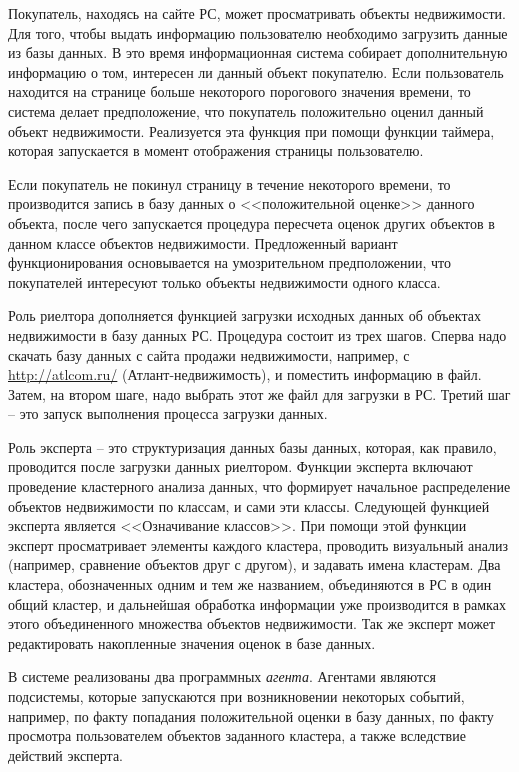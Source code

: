 \documentclass[a4paper,14pt,openany,final]{extreport} %
\begin{document}
Покупатель, находясь на сайте РС, может просматривать объекты недвижимости.  Для того, чтобы выдать информацию пользователю необходимо загрузить данные из базы данных. В это время информационная система собирает дополнительную информацию о том, интересен ли данный объект покупателю. Если пользователь находится на странице больше некоторого порогового значения времени, то система делает предположение, что покупатель положительно оценил данный объект недвижимости. Реализуется эта функция при помощи функции таймера, которая запускается в момент отображения страницы пользователю.

Если покупатель не покинул страницу в течение некоторого времени, то производится запись в базу данных о <<положительной оценке>> данного объекта, после чего запускается процедура пересчета оценок других объектов в данном классе объектов недвижимости. Предложенный вариант функционирования основывается на умозрительном предположении, что покупателей интересуют только объекты недвижимости одного класса.

Роль риелтора дополняется функцией загрузки исходных данных об объектах недвижимости в базу данных РС. Процедура состоит из трех шагов. Сперва надо скачать базу данных с сайта продажи недвижимости, например, с \url{http://atlcom.ru/} (Атлант-недвижимость), и поместить информацию в файл.  Затем, на втором шаге, надо выбрать этот же файл для загрузки в РС.  Третий шаг -- это запуск выполнения процесса загрузки данных.

Роль эксперта -- это структуризация данных базы данных, которая, как правило, проводится после загрузки данных риелтором. Функции эксперта включают проведение кластерного анализа данных, что формирует начальное распределение объектов недвижимости по классам, и сами эти классы.  Следующей функцией эксперта является <<Означивание классов>>.  При помощи этой функции эксперт просматривает элементы каждого кластера, проводить визуальный анализ (например, сравнение объектов друг с другом), и задавать имена кластерам. Два кластера, обозначенных одним и тем же названием, объединяются в РС в один общий кластер, и дальнейшая обработка информации уже производится в рамках этого объединенного множества объектов недвижимости.  Так же эксперт может редактировать накопленные значения оценок в базе данных. %

В системе реализованы два программных \emph{агента}. Агентами являются подсистемы, которые запускаются при возникновении некоторых событий, например, по факту попадания положительной оценки в базу данных, по факту просмотра пользователем объектов заданного кластера, а также вследствие действий эксперта.
\end{document}
